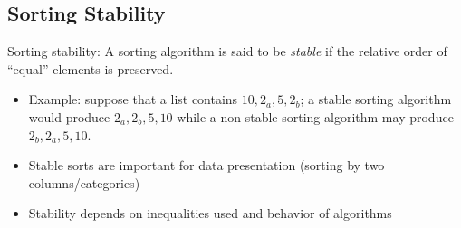 \subsection{Sorting Stability}


Sorting stability: A sorting algorithm is said to be \emph{stable} if the relative order of ``equal'' elements is preserved.
\begin{itemize}
  \item Example: suppose that a list contains $10, 2_a, 5, 2_b$; a stable sorting algorithm would produce $2_a, 2_b, 5, 10$
	while a non-stable sorting algorithm may produce $2_b, 2_a, 5, 10$.
  \item Stable sorts are important for data presentation (sorting by two columns/categories)
  \item Stability depends on inequalities used and behavior of algorithms
\end{itemize}


